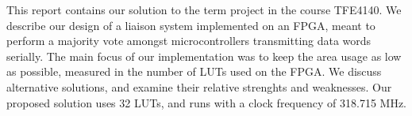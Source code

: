 \abstract This report contains our solution to the term project in the
course TFE4140. We describe our design of a liaison system implemented
on an FPGA, meant to perform a majority vote amongst microcontrollers
transmitting data words serially. The main focus of our implementation
was to keep the area usage as low as possible, measured in the number
of LUTs used on the FPGA. We discuss alternative solutions, and
examine their relative strenghts and weaknesses.  Our proposed
solution uses 32 LUTs, and runs with a clock frequency of 318.715 MHz.
